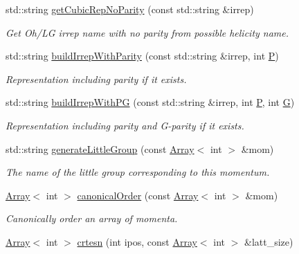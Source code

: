 \begin{DoxyCompactItemize}
std\+::string \mbox{\hyperlink{namespaceHadron_a6efae379facc253e72b35cf4d235dc88}{get\+Cubic\+Rep\+No\+Parity}} (const std\+::string \&irrep)
\begin{DoxyCompactList}\small\item\em Get Oh/\+LG irrep name with no parity from possible helicity name. \end{DoxyCompactList}\item 
std\+::string \mbox{\hyperlink{namespaceHadron_a036614bb88af01a4308fe463a99f5b12}{build\+Irrep\+With\+Parity}} (const std\+::string \&irrep, int \mbox{\hyperlink{adat__devel_2lib_2hadron_2operator__name__util_8cc_aef94be98e2c9e4a4dece75f60ca9792c}{P}})
\begin{DoxyCompactList}\small\item\em Representation including parity if it exists. \end{DoxyCompactList}\item 
std\+::string \mbox{\hyperlink{namespaceHadron_a45b2852ba4456b8729474ced77a3615f}{build\+Irrep\+With\+PG}} (const std\+::string \&irrep, int \mbox{\hyperlink{adat__devel_2lib_2hadron_2operator__name__util_8cc_aef94be98e2c9e4a4dece75f60ca9792c}{P}}, int \mbox{\hyperlink{adat__devel_2lib_2hadron_2operator__name__util_8cc_ab8735735273b982cc3125e51fe46e2f4}{G}})
\begin{DoxyCompactList}\small\item\em Representation including parity and G-\/parity if it exists. \end{DoxyCompactList}\item 
std\+::string \mbox{\hyperlink{namespaceHadron_a511bab858a88c02ec88a697fd5430e0d}{generate\+Little\+Group}} (const \mbox{\hyperlink{classXMLArray_1_1Array}{Array}}$<$ int $>$ \&mom)
\begin{DoxyCompactList}\small\item\em The name of the little group corresponding to this momentum. \end{DoxyCompactList}\item 
\mbox{\hyperlink{classXMLArray_1_1Array}{Array}}$<$ int $>$ \mbox{\hyperlink{namespaceHadron_a12bd76a337723c31527ee95d46f170d1}{canonical\+Order}} (const \mbox{\hyperlink{classXMLArray_1_1Array}{Array}}$<$ int $>$ \&mom)
\begin{DoxyCompactList}\small\item\em Canonically order an array of momenta. \end{DoxyCompactList}\item 
\mbox{\hyperlink{classXMLArray_1_1Array}{Array}}$<$ int $>$ \mbox{\hyperlink{namespaceHadron_a10fe1c3c465ac8dd8b6edab007aa6ab7}{crtesn}} (int ipos, const \mbox{\hyperlink{classXMLArray_1_1Array}{Array}}$<$ int $>$ \&latt\+\_\+size)

\end{DoxyCompactItemize}
